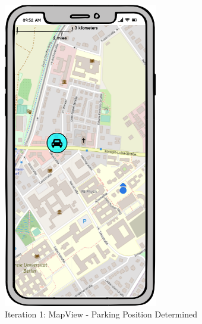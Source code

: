 \begin{figure}[H]
  \centering
  \begin{minipage}[b]{0.45\textwidth}
    \centering
    \includegraphics[width=0.6\textwidth]{images/UI/Iteration1-MapView-ParkingPositionDetermined.png}
    \caption{Iteration 1: MapView - Parking Position Determined}
    \label{fig:i1-mv-parking}
  \end{minipage}
  \hfill
  \begin{minipage}[b]{0.45\textwidth}
    \centering

\end{minipage}
\end{figure}
